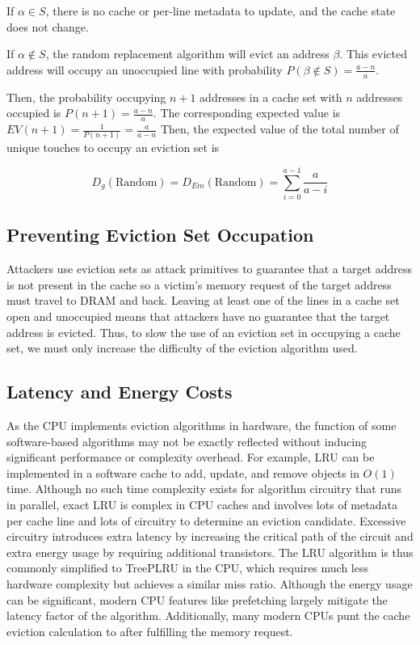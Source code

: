 \documentclass[letterpaper]{article}
\begin{document}
If $\alpha \in S$, there is no cache or per-line metadata to update, and the cache state does not change.

If $\alpha \notin S$, the random replacement algorithm will evict an address $\beta$.
This evicted address will occupy an unoccupied line with probability
$P(\beta \notin S) = \frac{a-n}{a}$.

Then, the probability occupying $n+1$ addresses in a cache set with $n$ addresses occupied is $P(n+1) = \frac{a-n}{a}$.
The corresponding expected value is $EV(n+1) = \frac{1}{P(n+1)} = \frac{a}{a-n}$
Then, the expected value of the total number of unique touches to occupy an eviction set is

\begin{equation}\label{RandomExpected}
    D_g(\text{Random}) = D_{Em}(\text{Random}) = \sum_{i=0}^{a-1}{\frac{a}{a-i}}
\end{equation}

\subsection{Preventing Eviction Set Occupation}
Attackers use eviction sets as attack primitives to guarantee that a target address is not present in the cache
so a victim's memory request of the target address must travel to DRAM and back.
Leaving at least one of the lines in a cache set open and unoccupied means that attackers have no guarantee that the target address is evicted.
Thus, to slow the use of an eviction set in occupying a cache set, we must only increase the difficulty of the eviction algorithm used.

\subsection{Latency and Energy Costs}

As the CPU implements eviction algorithms in hardware, the function of some software-based algorithms
may not be exactly reflected without inducing significant performance or complexity overhead.
For example, LRU can be implemented in a software cache to add, update, and remove objects in $O(1)$ time.
Although no such time complexity exists for algorithm circuitry that runs in parallel,
exact LRU is complex in CPU caches and involves lots of metadata per cache line and lots of circuitry to
determine an eviction candidate.
Excessive circuitry introduces extra latency by increasing the critical path of the circuit
and extra energy usage by requiring additional transistors.
The LRU algorithm is thus commonly simplified to TreePLRU in the CPU, which requires much less hardware complexity
but achieves a similar miss ratio.
Although the energy usage can be significant, modern CPU features like prefetching largely mitigate the latency factor of the algorithm.
Additionally, many modern CPUs punt the cache eviction calculation to after fulfilling the memory request.
\end{document}
